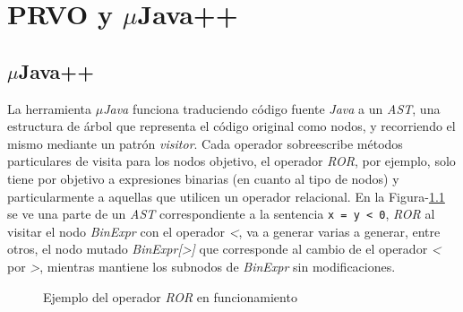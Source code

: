 \chapter[Implementaci\'on]{PRVO y $\mu$Java++}
\label{cap:implementation}

\section{$\mu$Java++}

La herramienta \emph{$\mu$Java} \cite{bibliography.mutation.tools.muJavaMaOK05} funciona traduciendo c\'odigo fuente \emph{Java} a un \emph{AST}, una estructura de \'arbol que representa el c\'odigo original como nodos, y recorriendo el mismo mediante un patr\'on \emph{visitor}. Cada operador sobreescribe m\'etodos particulares de visita para los nodos objetivo, el operador \emph{ROR}, por ejemplo, solo tiene por objetivo a expresiones binarias (en cuanto al tipo de nodos) y particularmente a aquellas que utilicen un operador relacional. En la Figura-\ref{figures.examples.rorMutation} se ve una parte de un \emph{AST} correspondiente a la sentencia \lstinline|x = y < 0|, \emph{ROR} al visitar el nodo \emph{BinExpr} con el operador \emph{<}, va a generar varias a generar, entre otros, el nodo mutado \emph{BinExpr[>]} que corresponde al cambio de el operador \emph{<} por \emph{>}, mientras mantiene los subnodos de \emph{BinExpr} sin modificaciones.

\begin{figure}
	\caption{Ejemplo del operador \emph{ROR} en funcionamiento}
	\label{figures.examples.rorMutation}
\end{figure}

